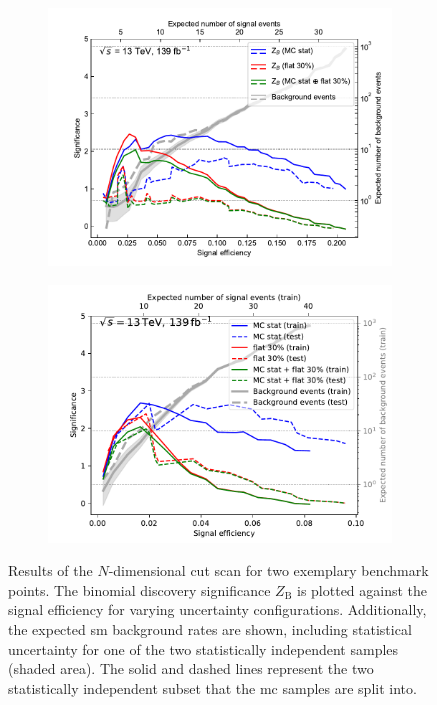 \begin{figure}
\begin{subfigure}[b]{0.5\linewidth}
		\caption{}
	\end{subfigure}\hfill
	\begin{subfigure}[b]{0.5\linewidth}
		\centering\includegraphics[width=1.0\textwidth]{N-1_cut_scan/z_vs_effs_600_300.pdf}
		\caption{}
	\end{subfigure}\hfill
	\begin{subfigure}[b]{0.5\linewidth}
		\centering\includegraphics[width=1.0\textwidth]{N-1_cut_scan/z_vs_effs_400_200.pdf}
		\caption{}
	\end{subfigure}\hfill

	\caption[N-dimensional cut scan results]{Results of the $N$-dimensional cut scan for two exemplary benchmark points. The binomial discovery significance $Z_\mathrm{B}$ is plotted against the signal efficiency for varying uncertainty configurations. Additionally, the expected \gls{sm} background rates are shown, including statistical uncertainty for one of the two statistically independent samples (shaded area). The solid and dashed lines represent the two statistically independent subset that the \gls{mc} samples are split into.}
	\label{fig:results_z_vs_eff_rest}
\end{figure}


